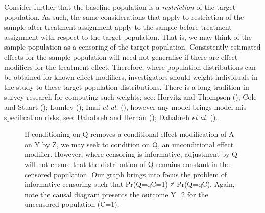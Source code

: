 \documentclass[
  singlecolumn]{article}
\begin{document}
Consider further that the baseline population is a \emph{restriction} of
the target population. As such, the same considerations that apply to
restriction of the sample after treatment assignment apply to the sample
before treatment assignment with respect to the target population. That
is, we may think of the sample population as a censoring of the target
population. Consistently estimated effects for the sample population
will need not generalise if there are effect modifiers for the treatment
effect. Therefore, where population distributions can be obtained for
known effect-modifiers, investigators should weight individuals in the
study to these target population distributions. There is a long
tradition in survey research for computing such weights; see: Horvitz
and Thompson (); Cole and
Stuart (); Lumley
(); Imai \emph{et al.}
(), however any model
brings model mis-specification risks; see: Dahabreh and Hernán
(); Dahabreh \emph{et al.}
().

\begin{figure}


\caption{\label{fig-experiment-selection-restriction-adjustment-4}If
conditioning on Q removes a conditional effect-modification of A on Y by
Z, we may seek to condition on Q, an unconditional effect modifier.
However, where censoring is informative, adjustment by Q will not ensure
that the distribution of Q remains constant in the censored population.
Our graph brings into focus the problem of informative censoring such
that Pr(Q=q\textbar C=1) ≠ Pr(Q=q\textbar C). Again, note the causal
diagram presents the outcome Y\_2 for the uncensored population (C=1).}

\end{figure}%
\end{document}
